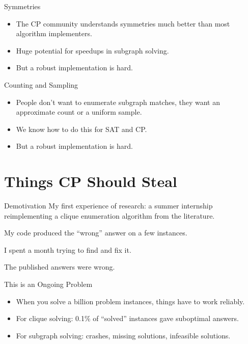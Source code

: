 \documentclass[aspectratio=169,compress,10pt]{beamer}
\begin{document}
\begin{frame}{Symmetries}
    \begin{itemize}
        \item The CP community understands symmetries much better than most algorithm implementers.
        \item Huge potential for speedups in subgraph solving.
        \item <2-> But a robust implementation is hard.
    \end{itemize}
\end{frame}

\begin{frame}{Counting and Sampling}
    \begin{itemize}
        \item People don't want to enumerate subgraph matches, they want an approximate count or
            a uniform sample.
        \item We know how to do this for SAT and CP.
        \item <2-> But a robust implementation is hard.
    \end{itemize}
\end{frame}

\section{Things CP Should Steal}

\begin{frame}{Demotivation}
    My first experience of research: a summer internship reimplementing a clique enumeration algorithm from the literature.

    \bigskip

    My code produced the ``wrong'' answer on a few instances.

    \bigskip\pause

    I spent a month trying to find and fix it.

    \bigskip\pause

    The published answers were wrong.
\end{frame}

\begin{frame}{This is an Ongoing Problem}
    \begin{itemize}
        \item When you solve a billion problem instances, things have to work reliably.
        \item For clique solving: 0.1\% of ``solved'' instances gave suboptimal answers.
        \item For subgraph solving: crashes, missing solutions, infeasible solutions.
    \end{itemize}
\end{frame}
\end{document}
